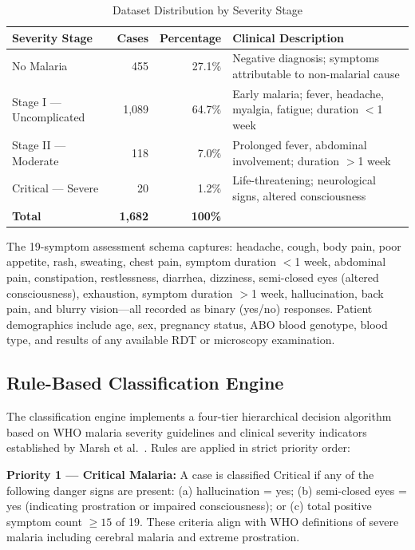 \documentclass[12pt,a4paper]{article}
\begin{document}
\begin{table}[H]
\centering
\caption{Dataset Distribution by Severity Stage}
\label{tab:dataset}
\begin{tabular}{@{}lrrp{6cm}@{}}
\toprule
\textbf{Severity Stage} & \textbf{Cases} & \textbf{Percentage} & \textbf{Clinical Description} \\
\midrule
No Malaria              & 455   & 27.1\%  & Negative diagnosis; symptoms attributable to non-malarial cause \\
Stage I --- Uncomplicated & 1,089 & 64.7\% & Early malaria; fever, headache, myalgia, fatigue; duration $<$1 week \\
Stage II --- Moderate   & 118   & 7.0\%   & Prolonged fever, abdominal involvement; duration $>$1 week \\
Critical --- Severe     & 20    & 1.2\%   & Life-threatening; neurological signs, altered consciousness \\
\midrule
\textbf{Total}          & \textbf{1,682} & \textbf{100\%} & \\
\bottomrule
\end{tabular}
\end{table}

The 19-symptom assessment schema captures: headache, cough, body pain, poor appetite, rash, sweating, chest pain, symptom duration $<$1 week, abdominal pain, constipation, restlessness, diarrhea, dizziness, semi-closed eyes (altered consciousness), exhaustion, symptom duration $>$1 week, hallucination, back pain, and blurry vision---all recorded as binary (yes/no) responses. Patient demographics include age, sex, pregnancy status, ABO blood genotype, blood type, and results of any available RDT or microscopy examination.

\subsection{Rule-Based Classification Engine}

The classification engine implements a four-tier hierarchical decision algorithm based on WHO malaria severity guidelines \cite{ref2} and clinical severity indicators established by Marsh et al.\ \cite{ref18}. Rules are applied in strict priority order:

\textbf{Priority 1 --- Critical Malaria:}
A case is classified Critical if any of the following danger signs are present: (a) hallucination = yes; (b) semi-closed eyes = yes (indicating prostration or impaired consciousness); or (c) total positive symptom count $\geq 15$ of 19. These criteria align with WHO definitions of severe malaria including cerebral malaria and extreme prostration.
\end{document}
